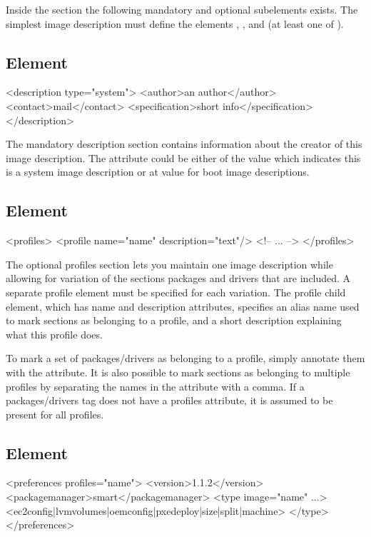 Inside the  section the following mandatory and optional
subelements exists. The simplest image description must define the
elements , , 
 and  (at least one of 
).

\subsection{ Element}
\begin{xml}
<description type="system">
  <author>an author</author>
  <contact>mail</contact>
  <specification>short info</specification>
</description>
\end{xml}

The mandatory description section contains information about
the creator of this image description. The attribute 
could be either of the value  which indicates this is a
system image description or at value  for boot image
descriptions.

\subsection{ Element}
\begin{xml}
<profiles>
  <profile name="name" description="text"/>
  <!-- ... -->
</profiles>
\end{xml}

The optional profiles section lets you maintain one image description
while allowing for variation of the sections packages and drivers that are
included. A separate profile element must be specified for each variation.
The profile child element, which has name and description attributes,
specifies an alias name used to mark sections as belonging to a profile,
and a short description explaining what this profile does.

To mark a set of packages/drivers as belonging to a profile, simply
annotate them with the  attribute. It is also possible
to mark sections as belonging to multiple profiles by separating the
names in the  attribute with a comma.
If a packages/drivers tag does not have a profiles attribute, it is
assumed to be present for all profiles.

\subsection{ Element}
\begin{xml}
<preferences profiles="name">
  <version>1.1.2</version>
  <packagemanager>smart</packagemanager>
  <type image="name" ...>
    <ec2config|lvmvolumes|oemconfig|pxedeploy|size|split|machine>
  </type>
</preferences>
\end{xml}

